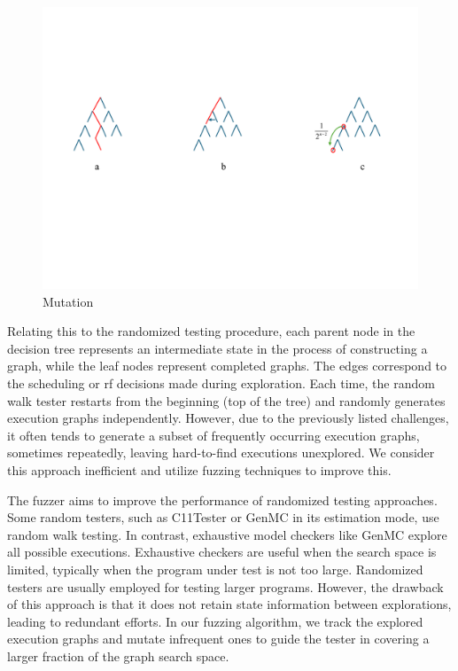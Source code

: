 \begin{figure}[h!tbp]  
    \centering
    \includegraphics[scale=0.5]{figure/tree3.pdf}   
    \caption{Mutation}  
    \label{tree3}  
\end{figure}


Relating this to the randomized testing procedure, each parent node in the decision tree represents an intermediate state in the process of constructing a graph, while the leaf nodes represent completed graphs. The edges correspond to the scheduling or rf decisions made during exploration. Each time, the random walk tester restarts from the beginning (top of the tree) and randomly generates execution graphs independently. However, due to the previously listed challenges, it often tends to generate a subset of frequently occurring execution graphs, sometimes repeatedly, leaving hard-to-find executions unexplored. We consider this approach inefficient and utilize fuzzing techniques to improve this. 



The fuzzer aims to improve the performance of randomized testing approaches. Some random testers, such as C11Tester or GenMC in its estimation mode, use random walk testing. In contrast, exhaustive model checkers like GenMC explore all possible executions. Exhaustive checkers are useful when the search space is limited, typically when the program under test is not too large. Randomized testers are usually employed for testing larger programs. However, the drawback of this approach is that it does not retain state information between explorations, leading to redundant efforts. In our fuzzing algorithm, we track the explored execution graphs and mutate infrequent ones to guide the tester in covering a larger fraction of the graph search space.

